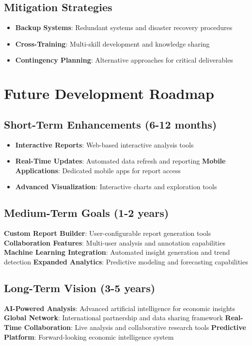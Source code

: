 \documentclass[11pt,a4paper]{article}
\begin{document}
\subsection{Mitigation Strategies}
\begin{itemize}
    \textbf{Quality Controls}: Multiple review stages and validation procedures
    \item \textbf{Backup Systems}: Redundant systems and disaster recovery procedures
    \item \textbf{Cross-Training}: Multi-skill development and knowledge sharing
    \item \textbf{Contingency Planning}: Alternative approaches for critical deliverables
\end{itemize}

\section{Future Development Roadmap}

\subsection{Short-Term Enhancements (6-12 months)}
\begin{itemize}
    \item \textbf{Interactive Reports}: Web-based interactive analysis tools
    \item \textbf{Real-Time Updates}: Automated data refresh and reporting
    \textbf{Mobile Applications}: Dedicated mobile apps for report access
    \item \textbf{Advanced Visualization}: Interactive charts and exploration tools
\end{itemize}

\subsection{Medium-Term Goals (1-2 years)}
\begin{itemize}
    \textbf{Custom Report Builder}: User-configurable report generation tools
    \textbf{Collaboration Features}: Multi-user analysis and annotation capabilities
    \textbf{Machine Learning Integration}: Automated insight generation and trend detection
    \textbf{Expanded Analytics}: Predictive modeling and forecasting capabilities
\end{itemize}

\subsection{Long-Term Vision (3-5 years)}
\begin{itemize}
    \textbf{AI-Powered Analysis}: Advanced artificial intelligence for economic insights
    \textbf{Global Network}: International partnership and data sharing framework
    \textbf{Real-Time Collaboration}: Live analysis and collaborative research tools
    \textbf{Predictive Platform}: Forward-looking economic intelligence system
\end{itemize}
\end{document}

